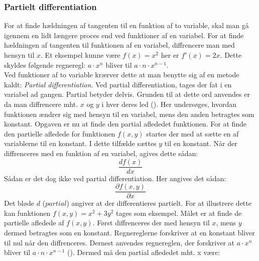 
\subsubsection{Partielt differentiation}\label{sec:PartieltDifferentiation}
For at finde hældningen af tangenten til en funktion af to variable, skal man gå igennem en lidt længere proces end ved funktioner af en variabel. For at finde hældningen af tangenten til funktionen af en variabel, diffrencere man med hensyn til $x$. Et eksempel kunne være $f(x) = x^2$ her er $f'(x) = 2x$. Dette skyldes følgende regneregl: $a \cdot x^n$ bliver til $a \cdot n \cdot x^{n-1}$. \\ Ved funktioner af to variable krærver dette at man benytte sig af en metode kaldt: \textit{Partial differentiation}. Ved partial differentiation, tages der fat i en variabel ad gangen. Partial betyder delvis. Grunden til at dette ord anvendes er da man diffrencere mht. $x$ og $y$ i hver deres led (\cite[4]{Larsen2016}). Her undersøges, hvordan funktionen ændrer sig med hensyn til en variabel, mens den anden betragtes som konstant. Opgaven er nu at finde den partial aflededet funktionen. For at finde den partielle afledede for funktionen $f(x,y)$ startes der med at sætte en af variablerne til en konstant. I dette tilfælde sættes $y$ til en konstant. Når der diffrenceres med en funktion af en variabel, agives dette sådan: \begin{equation}\frac{d f(x)}{d x}\end{equation} Sådan er det dog ikke ved partial differentiation. Her angives det sådan: \begin{equation}\frac{\partial f(x,y)}{\partial x}\end{equation} 
Det bløde $d$ ($partial$) angiver at der differentieres partielt. For at illustrere dette kan funktionen $f(x,y) = x^2 + 3y^2$ tages som eksempel. Målet er at finde de partielle afledede af $f(x,y)$. Først diffrenceres der med hensyn til $x$, mens $y$ dermed betragtes som en konstant. Regnereglerne forskriver at en konstant bliver til nul når den diffrenceres. Dernest anvendes regnereglen, der forskriver at \begin{math}a \cdot x^n\end{math} bliver til \begin{math}a \cdot n \cdot x^{n-1}\end{math} (\cite[14]{Pihl2019}). Dermed må den partial aflededet mht. x være: 

